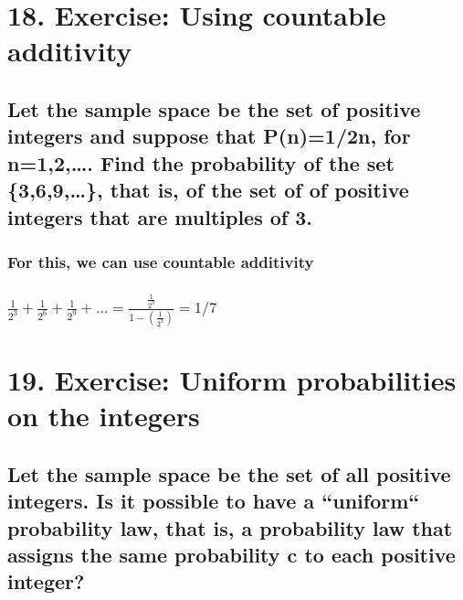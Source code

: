 \documentclass[11pt]{article}
\begin{document}
\section{18. Exercise: Using countable additivity}
\label{sec:org75b1cc5}
\subsection{Let the sample space be the set of positive integers and suppose that P(n)=1/2n, for n=1,2,…. Find the probability of the set \{3,6,9,…\}, that is, of the set of of positive integers that are multiples of 3.}
\label{sec:org5437b55}
\subsubsection{For this, we can use countable additivity}
\label{sec:orgab452f0}
\subsubsection{\(\frac{1}{2^3} + \frac{1}{2^6} + \frac{1}{2^9} +...= \frac{\frac{1}{2^3}}{1-(\frac{1}{2^3})} = 1/7\)}
\label{sec:orgeaeedc4}
\section{19. Exercise: Uniform probabilities on the integers}
\label{sec:orgb3330a9}
\subsection{Let the sample space be the set of all positive integers. Is it possible to have a “uniform`` probability law, that is, a probability law that assigns the same probability c to each positive integer?}
\label{sec:orgffadb2e}
\end{document}
